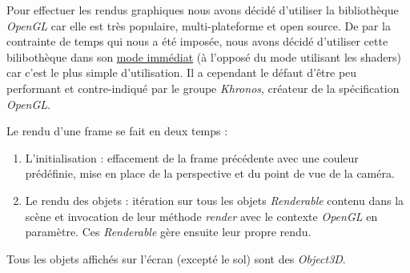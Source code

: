 \documentclass[11pt]{report}
\begin{document}
Pour effectuer les rendus graphiques nous avons décidé d'utiliser la bibliothèque \textit{OpenGL} car elle est très populaire, multi-plateforme et open source. De par la contrainte de temps qui nous a été imposée, nous avons décidé d'utiliser cette bilibothèque dans son \href{https://stackoverflow.com/a/6734071/15223555}{\color{blue}mode immédiat} (à l'opposé du mode utilisant les shaders) car c'est le plus simple d'utilisation. Il a cependant le défaut d'être peu performant et contre-indiqué par le groupe \textit{Khronos}, créateur de la spécification \textit{OpenGL}.


Le rendu d'une frame se fait en deux temps :

\begin{enumerate}
  \item L'initialisation : effacement de la frame précédente avec une couleur prédéfinie, mise en place de la perspective et du point de vue de la caméra.
  \item Le rendu des objets : itération sur tous les objets \textit{Renderable} contenu dans la scène et invocation de leur méthode \textit{render} avec le contexte \textit{OpenGL} en paramètre. Ces \textit{Renderable} gère ensuite leur propre rendu.
\end{enumerate}

Tous les objets affichés sur l'écran (excepté le sol) sont des \textit{Object3D}.
\end{document}
